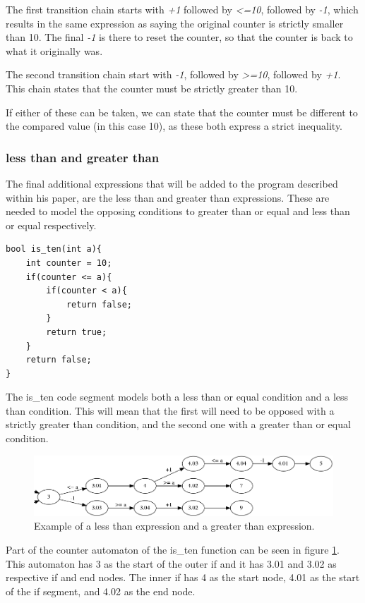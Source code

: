 \documentclass[12pt]{article}
\begin{document}
The first transition chain starts with \textit{+1} followed by \textit{\textless =10}, followed by \textit{-1}, which results in the same expression as saying the original counter is strictly smaller than 10. The final \textit{-1} is there to reset the counter, so that the counter is back to what it originally was. 

The second transition chain start with \textit{-1}, followed by \textit{\textgreater =10}, followed by \textit{+1}. This chain states that the counter must be strictly greater than 10.

If either of these can be taken, we can state that the counter must be different to the compared value (in this case 10), as these both express a strict inequality. 

\subsubsection{less than and greater than}
The final additional expressions that will be added to the program described within his paper, are the less than and greater than expressions. These are needed to model the opposing conditions to greater than or equal and less than or equal respectively.

\begin{lstlisting}[style=CStyle]
bool is_ten(int a){
	int counter = 10;
	if(counter <= a){
		if(counter < a){
			return false;
		}
		return true;
	}
	return false;
}
\end{lstlisting}

The is\_ten code segment models both a less than or equal condition and a less than condition. This will mean that the first will need to be opposed with a strictly greater than condition, and the second one with a greater than or equal condition.

\begin{figure}[h]
	\centering
	\includegraphics[width=\linewidth]{less_than_greater_than}
	\caption{Example of a less than expression and a greater than expression.}
	\label{fig:less_than_greater_than}
\end{figure}
\newpage
Part of the counter automaton of the is\_ten function can be seen in figure \ref{fig:less_than_greater_than}. This automaton has 3 as the start of the outer if and it has 3.01 and 3.02 as respective if and end nodes. The inner if has 4 as the start node, 4.01 as the start of the if segment, and 4.02 as the end node.
\end{document}
